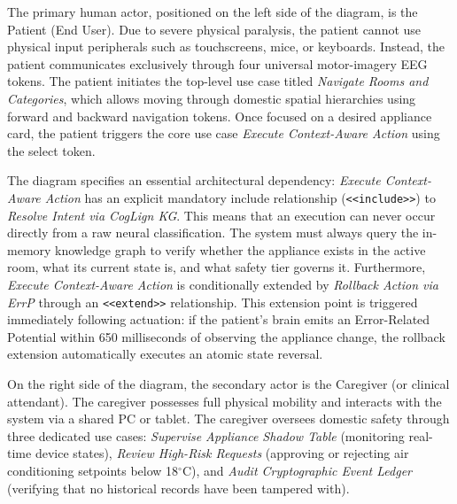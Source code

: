 \documentclass[12pt,a4paper]{report}
\begin{document}
The primary human actor, positioned on the left side of the diagram, is the Patient (End User). Due to severe physical paralysis, the patient cannot use physical input peripherals such as touchscreens, mice, or keyboards. Instead, the patient communicates exclusively through four universal motor-imagery EEG tokens. The patient initiates the top-level use case titled \textit{Navigate Rooms and Categories}, which allows moving through domestic spatial hierarchies using forward and backward navigation tokens. Once focused on a desired appliance card, the patient triggers the core use case \textit{Execute Context-Aware Action} using the select token.

The diagram specifies an essential architectural dependency: \textit{Execute Context-Aware Action} has an explicit mandatory include relationship (\texttt{<<include>>}) to \textit{Resolve Intent via CogLign KG}. This means that an execution can never occur directly from a raw neural classification. The system must always query the in-memory knowledge graph to verify whether the appliance exists in the active room, what its current state is, and what safety tier governs it. Furthermore, \textit{Execute Context-Aware Action} is conditionally extended by \textit{Rollback Action via ErrP} through an \texttt{<<extend>>} relationship. This extension point is triggered immediately following actuation: if the patient's brain emits an Error-Related Potential within 650 milliseconds of observing the appliance change, the rollback extension automatically executes an atomic state reversal.

On the right side of the diagram, the secondary actor is the Caregiver (or clinical attendant). The caregiver possesses full physical mobility and interacts with the system via a shared PC or tablet. The caregiver oversees domestic safety through three dedicated use cases: \textit{Supervise Appliance Shadow Table} (monitoring real-time device states), \textit{Review High-Risk Requests} (approving or rejecting air conditioning setpoints below 18$^\circ$C), and \textit{Audit Cryptographic Event Ledger} (verifying that no historical records have been tampered with).
\end{document}
